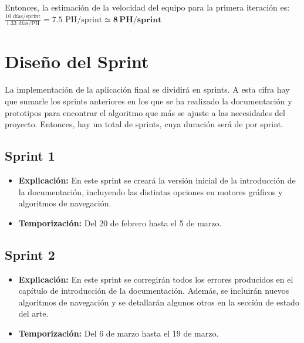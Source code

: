 \bigskip

Entonces, la estimación de la velocidad del equipo para la primera iteración es: $\frac{10 \text{ días/sprint}}{1.33 \text{ días/PH}} = 7.5 \text{ PH/sprint} \simeq \mathbf{8\,PH/sprint}$

\section{Diseño del Sprint}


La implementación de la aplicación final se dividirá en \sprintNro sprints. A esta cifra hay que sumarle los \docSprints sprints anteriores en los que se ha realizado la documentación y prototipos para encontrar el algoritmo que más se ajuste a las necesidades del proyecto. Entonces, hay un total de \totalSprints sprints, cuya duración será de \sprintLength por sprint.

\subsection{Sprint 1}
\begin{itemize}
    \item \textbf{Explicación:} En este sprint se creará la versión inicial de la introducción de la documentación, incluyendo las distintas opciones en motores gráficos y algoritmos de navegación.

    \item \textbf{Temporización:} Del 20 de febrero hasta el 5 de marzo.
\end{itemize}

\subsection{Sprint 2}
\begin{itemize}
    \item \textbf{Explicación:} En este sprint se corregirán todos los errores producidos en el capítulo de introducción de la documentación. Además, se incluirán nuevos algoritmos de navegación y se detallarán algunos otros en la sección de estado del arte.
    \item \textbf{Temporización:} Del 6 de marzo hasta el 19 de marzo. 
\end{itemize}

